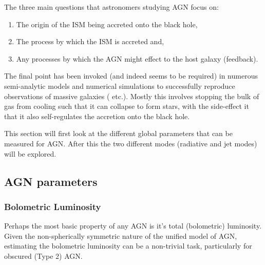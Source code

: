 	The three main questions that astronomers studying AGN focus on:
	\begin{enumerate}
		\item The origin of the ISM being accreted onto the black hole,
		\item The process by which the ISM is accreted and,
		\item Any processes by which the AGN might effect to the host galaxy (feedback).
	\end{enumerate}
	The final point has been invoked (and indeed seems to be required) in numerous semi-analytic models and numerical simulations to successfully reproduce observations of massive galaxies (\citet{DiMatteo2005, Bower2006, Springel2005} etc.). Mostly this involves stopping the bulk of gas from cooling such that it can collapse to form stars, with the side-effect it that it also self-regulates the accretion onto the black hole.

	This section will first look at the different global parameters that can be measured for AGN. After this the two different modes (radiative and jet modes) will be explored.

	\subsection{AGN parameters}
		\label{subsec:AGNparams}

		\subsubsection{Bolometric Luminosity}
			Perhaps the most basic property of any AGN is it's total (bolometric) luminosity. Given the non-spherically symmetric nature of the unified model of AGN, estimating the bolometric luminosity can be a non-trivial task, particularly for obscured (Type 2) AGN. 

